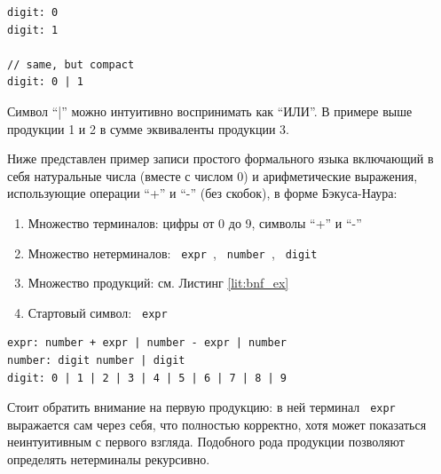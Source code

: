 \begin{code}
    \label{lit:prod}
    \begin{verbatim}
digit: 0
digit: 1

// same, but compact
digit: 0 | 1
    \end{verbatim}
\end{code}

Символ \enquote{|} можно интуитивно воспринимать как \enquote{ИЛИ}. В примере выше продукции 1 и 2 в сумме эквиваленты продукции 3.

Ниже представлен пример записи простого формального языка включающий в себя натуральные числа (вместе с числом 0) и арифметические выражения, использующие операции \enquote{+} и \enquote{-} (без скобок), в форме Бэкуса-Наура: 
\begin{enumerate}
    \item Множество терминалов: цифры от 0 до 9, символы \enquote{+} и \enquote{-}
    \item Множество нетерминалов: \texttt{ expr }, \texttt{ number }, \texttt{ digit }
    \item Множество продукций: см. Листинг \ref{lit:bnf_ex}
    \item Стартовый символ: \texttt{ expr }
\end{enumerate}

\begin{code}
    \label{lit:bnf_ex}
    \begin{verbatim}
expr: number + expr | number - expr | number
number: digit number | digit
digit: 0 | 1 | 2 | 3 | 4 | 5 | 6 | 7 | 8 | 9
    \end{verbatim}
\end{code}

Стоит обратить внимание на первую продукцию: в ней терминал \texttt{ expr } выражается сам через себя, что полностью корректно, хотя может показаться неинтуитивным с первого взгляда. Подобного рода продукции позволяют определять нетерминалы рекурсивно.

